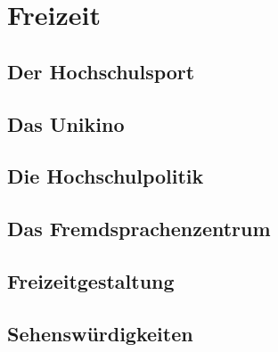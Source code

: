 \documentclass[12pt, a4paper]{article}
\begin{document}
\section{Freizeit}

\subsection{Der Hochschulsport}


\subsection{Das Unikino}


\subsection{Die Hochschulpolitik}



\subsection{Das Fremdsprachenzentrum}


\newpage
\subsection{Freizeitgestaltung}




%

%


\newpage
\subsection{Sehenswürdigkeiten}

\end{document}
